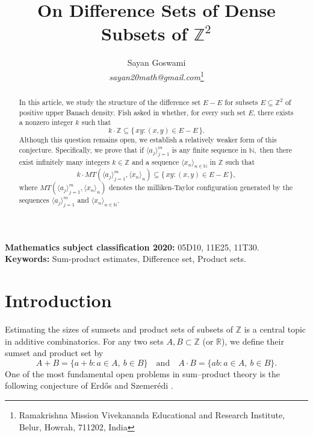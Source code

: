 \documentclass{article}
\date{\vspace{-5ex}}
\theoremstyle{Theorem}
\theoremstyle{definition}
\begin{document}
\title{{\bf On Difference Sets of Dense Subsets of $\mathbb{Z}^2$}}
\author{Sayan Goswami\\  \textit{sayan20math@gmail.com}\footnote{Ramakrishna Mission Vivekananda Educational and Research Institute, Belur, Howrah, 711202, India}}

\makeatother


\maketitle
\begin{abstract}
In this article, we study the structure of the difference set $E - E$ for subsets $E \subseteq \mathbb{Z}^2$ of positive upper Banach density. Fish asked in \cite[Problem~2]{fish} whether, for every such set $E$, there exists a nonzero integer $k$ such that
\[
k \cdot \mathbb{Z} \subseteq \{\, xy : (x,y) \in E - E \,\}.
\]
Although this question remains open, we establish a relatively weaker form of this conjecture. Specifically, we prove that if $\langle a_j\rangle_{j=1}^m$ is any finite sequence in $\mathbb{N},$ then there exist infinitely many integers $k \in \mathbb{Z}$ and a sequence $\langle x_n \rangle_{n \in \mathbb{N}}$ in $\mathbb{Z}$ such that
\[
k \cdot MT\left(\langle a_j \rangle_{j=1}^m, \langle x_n\rangle_{n}\right) \subseteq \{\, xy : (x,y) \in E - E \,\},
\]
where $MT\left(\langle a_j \rangle_{j=1}^m, \langle x_n\rangle_{n}\right)$ denotes the milliken-Taylor configuration generated by the sequences $\langle a_j\rangle_{j=1}^m$ and $\langle x_n \rangle_{n \in \mathbb{N}}$.
\end{abstract}


\noindent \textbf{Mathematics subject classification 2020:} 05D10, 11E25, 11T30.\\
\noindent \textbf{Keywords:} Sum-product estimates, Difference set, Product sets.


\section{Introduction}
Estimating the sizes of sumsets and product sets of subsets of $\mathbb{Z}$ is a central topic in additive combinatorics. For any two sets $A,B \subset \mathbb{Z}$ (or $\mathbb{R}$), we define their sumset and product set by
\[
A+B=\{a+b : a\in A,\ b\in B\}
\quad \text{and} \quad
A\cdot B=\{ab : a\in A,\ b\in B\}.
\]
One of the most fundamental open problems in sum--product theory is the following conjecture of Erd\H{o}s and Szemer\'{e}di \cite{erdos}.
\end{document}

